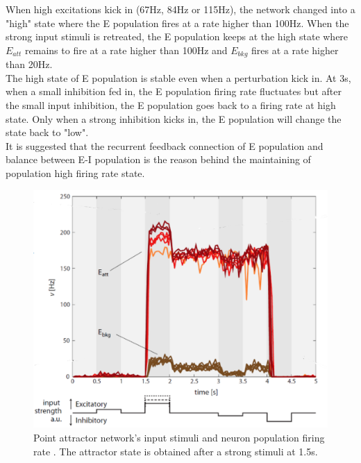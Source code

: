 When high excitations kick in (67Hz, 84Hz or 115Hz), the network changed into a "high" state where the E population fires at a rate higher than 100Hz. When the strong input stimuli is retreated, the E population keeps at the high state where $E_{att}$ remains to fire at a rate higher than 100Hz and $E_{bkg}$ fires at a rate higher than 20Hz.\\

The high state of E population is stable even when a perturbation kick in. At 3s, when a small inhibition fed in, the E population firing rate fluctuates but after the small input inhibition, the E population goes back to a firing rate at high state. Only when a strong inhibition kicks in, the E population will change the state back to "low".\\
It is suggested that the recurrent feedback connection of E population and balance between E-I population is the reason behind the maintaining of population high firing rate state.


\begin{figure}[htbp!]
	\centering
	\includegraphics[width=\columnwidth]{./img/readings/Attractor_behavior.pdf}
	\caption{Point attractor network's input stimuli and neuron population firing rate \cite{giudiceRobustWorkingMemory2012}. The attractor state is obtained after a strong stimuli at 1.5s.}
	\label{fig:reading_NNbehavior}
\end{figure}